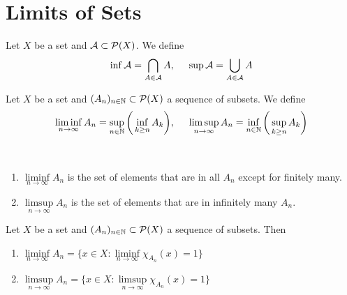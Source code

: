 \documentclass{book}
\begin{document}
	
	
	
	
	
	
	
	
	
	
	
	
	
	
	
	
	
	
	
	
	
	
	
	
	
	\newpage
	\section{Limits of Sets}
	
	\begin{defn}  
		Let $X$ be a set and $\mathcal{A} \subset \mathcal{P}(X)$. We define $$\inf \mathcal{A} = \bigcap_{A \in \mathcal{A} } A ,\hspace{.5cm} \sup \mathcal{A} = \bigcup_{A \in \mathcal{A}} A$$
		
	\end{defn}
	
	\begin{defn}  
		Let $X$ be a set and $(A_n)_{n \in \mathbb{N}} \subset \mathcal{P}(X)$ a sequence of subsets. We define
		$$\liminf_{n \rightarrow \infty} A_n = \sup\limits_{n \in \mathbb{N}} \bigg( \inf_{k \geq n}A_k \bigg), \hspace{.5cm } \limsup_{n \rightarrow \infty} A_n = \inf_{n \in \mathbb{N}} \bigg(\sup\limits_{k \geq n}A_k \bigg)$$
	\end{defn}
	
	\begin{note}\
		\begin{enumerate}
			\item $\liminf\limits_{n \rightarrow \infty} A_n$ is the set of elements that are in all $A_n$ except for finitely many. 
			
			\item $\limsup\limits_{n \rightarrow \infty} A_n$ is the set of elements that are in infinitely many $A_n$.
		\end{enumerate}
	\end{note}
	
	\begin{ex}  
		Let $X$ be a set and $(A_n)_{n \in \mathbb{N}} \subset \mathcal{P}(X)$ a sequence of subsets. Then 
		\begin{enumerate}
			\item $\liminf\limits_{n \rightarrow \infty}A_n = \bigg \{x \in X: \liminf\limits_{n \rightarrow \infty}\chi_{A_n}(x) = 1\bigg\}$
			\item $\limsup\limits_{n \rightarrow \infty}A_n = \bigg \{x \in X: \limsup\limits_{n \rightarrow \infty}\chi_{A_n}(x) = 1\bigg\}$
		\end{enumerate}
	\end{ex}
	
\end{document}
